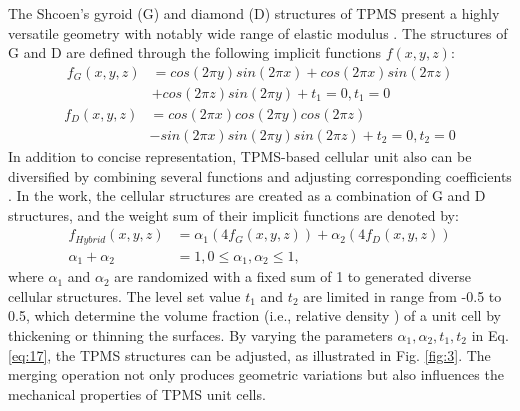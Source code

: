 \documentclass[preprint,review,12pt,authoryear]{elsarticle}
\begin{document}
The Shcoen's gyroid (G) and diamond (D) structures of TPMS present a highly versatile geometry with notably wide range of elastic modulus \citep{Lee2016}. The structures of G and D are defined through the following implicit functions $f(x,y,z)$:
\begin{equation}
\begin{aligned}
f_G(x,y,z)&= cos(2\pi y)sin(2\pi x)+cos(2\pi x)sin(2\pi z)\\&+cos(2\pi z)sin(2\pi y)+t_1 = 0, t_1 =0
\end{aligned}
\label{eq:15}
\end{equation}
\begin{equation}
\begin{aligned}
f_D(x,y,z)&=cos(2\pi x)cos(2\pi y)cos(2\pi z)\\&-sin(2\pi x)sin(2\pi y)sin(2\pi z)+t_2=0, t_2 =0
\end{aligned}
\label{eq:16}
\end{equation}
In addition to concise representation, TPMS-based cellular unit also can be diversified by combining several functions and adjusting corresponding coefficients \citep{Wang2019b}. In the work, the cellular structures are created as a combination of G and D structures, and the weight sum of their implicit functions are denoted by:
\begin{equation}
\begin{aligned}
    f_{Hybrid}(x, y, z) &=\alpha_1 (4f_G(x,y,z))+\alpha_2(4f_D(x, y,z ))\\
    \alpha_1+\alpha_2 &= 1,
    0\leq\alpha_1, \alpha_2 \leq1,
\end{aligned}
\label{eq:17}
\end{equation}
where $\alpha_1$ and $\alpha_2$ are randomized with a fixed sum of 1 to generated diverse cellular structures. The level set value $t_1$ and $t_2$ are limited in range from -0.5 to 0.5, which determine the volume fraction (i.e., relative density ) of a unit cell by thickening or thinning the surfaces. By varying the parameters $\alpha_1, \alpha_2, t_1, t_2$ in Eq.\ref{eq:17}, the TPMS structures can be adjusted, as illustrated in Fig. \ref{fig:3}. The merging operation not only produces geometric variations but also influences the mechanical properties of TPMS unit cells. 
\end{document}
